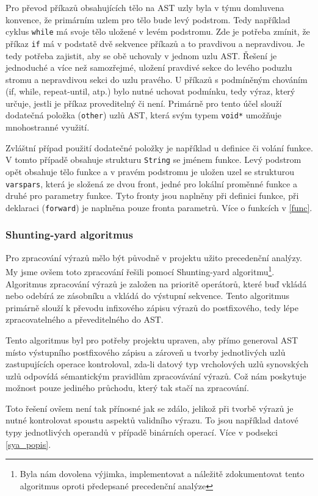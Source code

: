 \documentclass[12pt,a4paper,titlepage,final]{article}
\begin{document}
Pro převod příkazů obsahujících tělo na AST uzly byla v týmu domluvena konvence,
že primárním uzlem pro tělo bude levý podstrom. Tedy například cyklus \verb|while|
má svoje tělo uložené v levém podstromu. Zde je potřeba zmínit, že příkaz \verb|if|
má v podstatě dvě sekvence příkazů a to pravdivou a nepravdivou. Je tedy potřeba
zajistit, aby se obě uchovaly v jednom uzlu AST. Řešení je jednoduché a více než samozřejmé, uložení pravdivé sekce do levého
poduzlu stromu a nepravdivou sekci do uzlu pravého. U příkazů s podmíněným
chováním (if, while, repeat-until, atp.) bylo nutné uchovat podmínku, tedy výraz,
který určuje, jestli je příkaz proveditelný či není. Primárně pro tento účel
slouží dodatečná položka (\verb|other|) uzlů AST, která svým typem \verb|void*| umožňuje
mnohostranné využití. 

Zvláštní případ použití dodatečné položky je například u definice či volání funkce.
V tomto případě obsahuje strukturu \verb|String| se jménem funkce. Levý podstrom
opět obsahuje tělo funkce a v pravém podstromu je uložen uzel se strukturou \verb|varspars|,
která je složená ze dvou front, jedné pro lokální proměnné funkce a druhé pro
parametry funkce. Tyto fronty jsou naplněny při definici funkce, při deklaraci
(\verb|forward|) je naplněna pouze fronta parametrů. Více o funkcích v \ref{func}.

\subsubsection{Shunting-yard algoritmus} \label{sya}
Pro zpracování výrazů mělo být původně v projektu užito precedenční analýzy. My jsme ovšem toto zpracování řešili pomocí Shunting-yard algoritmu\footnote{Byla nám
dovolena výjimka, implementovat a náležitě zdokumentovat tento algoritmus oproti předepsané
precedenční analýze}. Algoritmus zpracování výrazů je založen na prioritě operátorů, které buď vkládá
nebo odebírá ze zásobníku a vkládá do výstupní sekvence. Tento algoritmus primárně
slouží k převodu infixového zápisu výrazů do postfixového, tedy lépe zpracovatelného
a převeditelného do AST.

Tento algoritmus byl pro potřeby projektu upraven, aby přímo generoval AST místo
výstupního postfixového zápisu a zároveň u tvorby jednotlivých uzlů zastupujících
operace kontroloval, zda-li datový typ vrcholových uzlů synovských uzlů odpovídá
sémantickým pravidlům zpracovávání výrazů. Což nám poskytuje možnost pouze jediného průchodu, který tak stačí na zpracování.

Toto řešení ovšem není tak přínosné jak se zdálo, jelikož při tvorbě výrazů je nutné kontrolovat spoustu aspektů validního výrazu. To jsou
například datové typy jednotlivých operandů v případě binárních operací. Více v podsekci \ref{sya_popis}.
\end{document}
